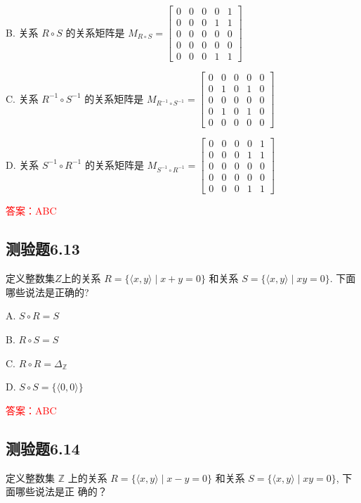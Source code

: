 \documentclass[UTF8, heading=true]{ctexart}
\begin{document}
B. 关系 $R \circ S$ 的关系矩阵是 $M_{R \circ S}=\left[\begin{array}{lllll}0 & 0 & 0 & 0 & 1 \\ 0 & 0 & 0 & 1 & 1 \\ 0 & 0 & 0 & 0 & 0 \\ 0 & 0 & 0 & 0 & 0 \\ 0 & 0 & 0 & 1 & 1\end{array}\right]$

C. 关系 $R^{-1} \circ S^{-1}$ 的关系矩阵是 $M_{R^{-1} \circ S^{-1}}=\left[\begin{array}{lllll}0 & 0 & 0 & 0 & 0 \\ 0 & 1 & 0 & 1 & 0 \\ 0 & 0 & 0 & 0 & 0 \\ 0 & 1 & 0 & 1 & 0 \\ 0 & 0 & 0 & 0 & 0\end{array}\right]$

D. 关系 $S^{-1} \circ R^{-1}$ 的关系矩阵是 $M_{S^{-1} \circ R^{-1}}=\left[\begin{array}{ccccc}0 & 0 & 0 & 0 & 1 \\ 0 & 0 & 0 & 1 & 1 \\ 0 & 0 & 0 & 0 & 0 \\ 0 & 0 & 0 & 0 & 0 \\ 0 & 0 & 0 & 1 & 1\end{array}\right]$

\textcolor{red}{答案：ABC}




\subsection{测验题6.13}
定义整数集$Z$上的关系 $R=\{\langle x, y\rangle \mid x+y=0\}$ 和关系 $S=\{\langle x, y\rangle \mid x y=0\}$. 下面哪些说法是正确的?

A. 
$
S \circ R=S
$

B. 
$
R \circ S=S
$

C. 
$
R \circ R=\Delta_{\mathbb{Z}}
$

D. 
$
S \circ S=\{\langle 0,0\rangle\}
$

\textcolor{red}{答案：ABC}

\subsection{测验题6.14}

定义整数集 $\mathbb{Z}$ 上的关系 $R=\{\langle x, y\rangle \mid x-y=0\}$ 和关系 $S=\{\langle x, y\rangle \mid x y=0\}$, 下面哪些说法是正
确的？
\end{document}
